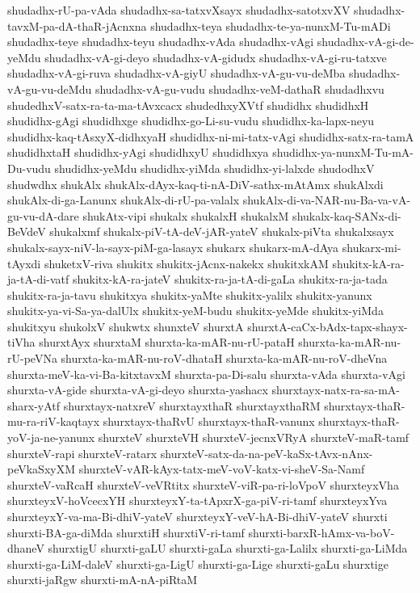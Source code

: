 {shudadhx-rU-pa-vAda
shudadhx-sa-tatxvXsayx
shudadhx-satotxvXV
shudadhx-tavxM-pa-dA-thaR-jAcnxna
shudadhx-teya
shudadhx-te-ya-nunxM-Tu-mADi
shudadhx-teye
shudadhx-teyu
shudadhx-vAda
shudadhx-vAgi
shudadhx-vA-gi-de-yeMdu
shudadhx-vA-gi-deyo
shudadhx-vA-gidudx
shudadhx-vA-gi-ru-tatxve
shudadhx-vA-gi-ruva
shudadhx-vA-giyU
shudadhx-vA-gu-vu-deMba
shudadhx-vA-gu-vu-deMdu
shudadhx-vA-gu-vudu
shudadhx-veM-dathaR
shudadhxvu
shudedhxV-satx-ra-ta-ma-tAvxcacx
shudedhxyXVtf
shudidhx
shudidhxH
shudidhx-gAgi
shudidhxge
shudidhx-go-Li-su-vudu
shudidhx-ka-lapx-neyu
shudidhx-kaq-tAsxyX-didhxyaH
shudidhx-ni-mi-tatx-vAgi
shudidhx-satx-ra-tamA
shudidhxtaH
shudidhx-yAgi
shudidhxyU
shudidhxya
shudidhx-ya-nunxM-Tu-mA-Du-vudu
shudidhx-yeMdu
shudidhx-yiMda
shudidhx-yi-lalxde
shudodhxV
shudwdhx
shukAlx
shukAlx-dAyx-kaq-ti-nA-DiV-sathx-mAtAmx
shukAlxdi
shukAlx-di-ga-Lanunx
shukAlx-di-rU-pa-valalx
shukAlx-di-va-NAR-nu-Ba-va-vA-gu-vu-dA-dare
shukAtx-vipi
shukalx
shukalxH
shukalxM
shukalx-kaq-SANx-di-BeVdeV
shukalxmf
shukalx-piV-tA-deV-jAR-yateV
shukalx-piVta
shukalxsayx
shukalx-sayx-niV-la-sayx-piM-ga-lasayx
shukarx
shukarx-mA-dAya
shukarx-mi-tAyxdi
shuketxV-riva
shukitx
shukitx-jAcnx-nakekx
shukitxkAM
shukitx-kA-ra-ja-tA-di-vatf
shukitx-kA-ra-jateV
shukitx-ra-ja-tA-di-gaLa
shukitx-ra-ja-tada
shukitx-ra-ja-tavu
shukitxya
shukitx-yaMte
shukitx-yalilx
shukitx-yanunx
shukitx-ya-vi-Sa-ya-dalUlx
shukitx-yeM-budu
shukitx-yeMde
shukitx-yiMda
shukitxyu
shukolxV
shukwtx
shunxteV
shurxtA
shurxtA-caCx-bAdx-tapx-shayx-tiVha
shurxtAyx
shurxtaM
shurxta-ka-mAR-nu-rU-pataH
shurxta-ka-mAR-nu-rU-peVNa
shurxta-ka-mAR-nu-roV-dhataH
shurxta-ka-mAR-nu-roV-dheVna
shurxta-meV-ka-vi-Ba-kitxtavxM
shurxta-pa-Di-salu
shurxta-vAda
shurxta-vAgi
shurxta-vA-gide
shurxta-vA-gi-deyo
shurxta-yashacx
shurxtayx-natx-ra-sa-mA-sharx-yAtf
shurxtayx-natxreV
shurxtayxthaR
shurxtayxthaRM
shurxtayx-thaR-mu-ra-riV-kaqtayx
shurxtayx-thaRvU
shurxtayx-thaR-vanunx
shurxtayx-thaR-yoV-ja-ne-yanunx
shurxteV
shurxteVH
shurxteV-jecnxVRyA
shurxteV-maR-tamf
shurxteV-rapi
shurxteV-ratarx
shurxteV-satx-da-na-peV-kaSx-tAvx-nAnx-peVkaSxyXM
shurxteV-vAR-kAyx-tatx-meV-voV-katx-vi-sheV-Sa-Namf
shurxteV-vaRcaH
shurxteV-veVRtitx
shurxteV-viR-pa-ri-loVpoV
shurxteyxVha
shurxteyxV-hoVcecxYH
shurxteyxY-ta-tApxrX-ga-piV-ri-tamf
shurxteyxYva
shurxteyxY-va-ma-Bi-dhiV-yateV
shurxteyxY-veV-hA-Bi-dhiV-yateV
shurxti
shurxti-BA-ga-diMda
shurxtiH
shurxtiV-ri-tamf
shurxti-barxR-hAmx-va-boV-dhaneV
shurxtigU
shurxti-gaLU
shurxti-gaLa
shurxti-ga-Lalilx
shurxti-ga-LiMda
shurxti-ga-LiM-daleV
shurxti-ga-LigU
shurxti-ga-Lige
shurxti-gaLu
shurxtige
shurxti-jaRgw
shurxti-mA-nA-piRtaM
}
